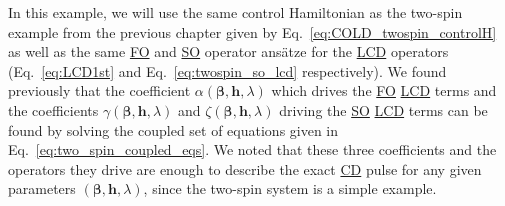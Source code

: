 \documentclass[a4paper,oneside,11pt]{book}
\newcommand{\betabb}{\boldsymbol{\beta}}
\newcommand{\hbb}{\boldsymbol{h}}
\newcommand{\acrref}[1]{\hyperref[acr:#1]{#1}}
\begin{document}
In this example, we will use the same control Hamiltonian as the two-spin example from the previous chapter given by Eq.~\eqref{eq:COLD_twospin_controlH} as well as the same \acrref{FO} and \acrref{SO} operator ans\"{a}tze for the \acrref{LCD} operators (Eq.~\eqref{eq:LCD1st} and Eq.~\eqref{eq:twospin_so_lcd} respectively). We found previously that the coefficient $\alpha(\betabb, \hbb, \lambda)$ which drives the \acrref{FO} \acrref{LCD} terms and the coefficients $\gamma(\betabb, \hbb, \lambda)$ and $\zeta(\betabb, \hbb, \lambda)$ driving the \acrref{SO} \acrref{LCD} terms can be found by solving the coupled set of equations given in Eq.~\eqref{eq:two_spin_coupled_eqs}. We noted that these three coefficients and the operators they drive are enough to describe the exact \acrref{CD} pulse for any given parameters $(\betabb, \hbb, \lambda)$, since the two-spin system is a simple example.
\end{document}

